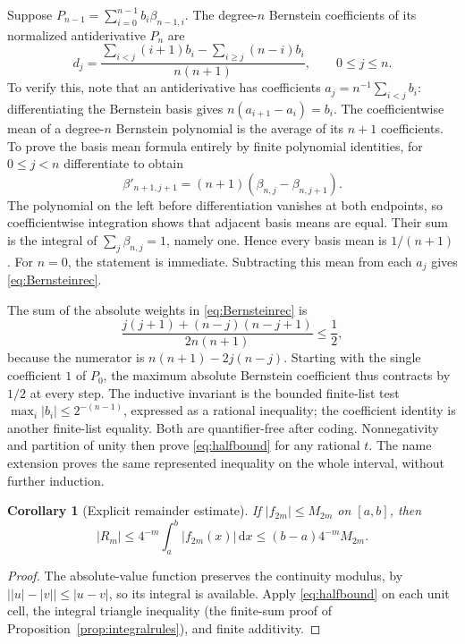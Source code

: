 \documentclass[11pt]{article}
\newtheorem{corollary}[theorem]{Corollary}
\theoremstyle{definition}
\newcommand{\abs}[1]{\left|#1\right|}
\newcommand{\dd}{\,\mathrm{d}}
\begin{document}
Suppose \(P_{n-1}=\sum_{i=0}^{n-1}b_i\beta_{n-1,i}\).  The degree-\(n\)
Bernstein coefficients of its normalized antiderivative \(P_n\) are
\begin{equation}
 d_j=\frac{\displaystyle\sum_{i<j}(i+1)b_i
                   -\displaystyle\sum_{i\ge j}(n-i)b_i}
                  {n(n+1)},\qquad 0\le j\le n.\label{eq:Bernsteinrec}
\end{equation}
To verify this, note that an antiderivative has coefficients
\(a_j=n^{-1}\sum_{i<j}b_i\): differentiating the Bernstein basis
gives \(n(a_{i+1}-a_i)=b_i\).  The coefficientwise mean of a
degree-\(n\) Bernstein polynomial is the average of its \(n+1\)
coefficients.  To prove the basis mean formula entirely by finite
polynomial identities, for \(0\le j<n\) differentiate to obtain
\[
 \beta'_{n+1,j+1}=(n+1)(\beta_{n,j}-\beta_{n,j+1}).
\]
The polynomial on the left before differentiation vanishes at both
endpoints, so coefficientwise integration shows that adjacent basis
means are equal.  Their sum is the integral of
\(\sum_j\beta_{n,j}=1\), namely one.  Hence every basis mean is
\(1/(n+1)\).  For \(n=0\), the statement is immediate.
Subtracting this mean from each \(a_j\) gives
\eqref{eq:Bernsteinrec}.

The sum of the absolute weights in \eqref{eq:Bernsteinrec} is
\begin{equation}
 \frac{j(j+1)+(n-j)(n-j+1)}{2n(n+1)}\le\frac12,\label{eq:Bernsteinweights}
\end{equation}
because the numerator is \(n(n+1)-2j(n-j)\).
Starting with the single coefficient \(1\) of \(P_0\), the maximum
absolute Bernstein coefficient thus contracts by \(1/2\) at every
step.  The inductive invariant is the bounded finite-list test
\(\max_i\abs{b_i}\le2^{-(n-1)}\), expressed as a rational inequality;
the coefficient identity is another finite-list equality.  Both are
quantifier-free after coding.  Nonnegativity and partition of unity
then prove \eqref{eq:halfbound} for any rational \(t\).
The name extension proves the same represented inequality on the
whole interval, without further induction.

\begin{corollary}[Explicit remainder estimate]\label{cor:remainder}
If \(\abs{f_{2m}}\le M_{2m}\) on \([a,b]\), then
\begin{equation}
 \abs{R_m}\le4^{-m}\int_a^b\abs{f_{2m}(x)}\dd x
              \le(b-a)4^{-m}M_{2m}.\label{eq:remainderbound}
\end{equation}
\end{corollary}
\begin{proof}
The absolute-value function preserves the continuity modulus, by
\(\bigl|\abs u-\abs v\bigr|\le\abs{u-v}\), so its integral is
available.  Apply \eqref{eq:halfbound} on each unit cell, the integral
triangle inequality (the finite-sum proof of
Proposition~\ref{prop:integralrules}), and finite additivity.
\end{proof}
\end{document}

